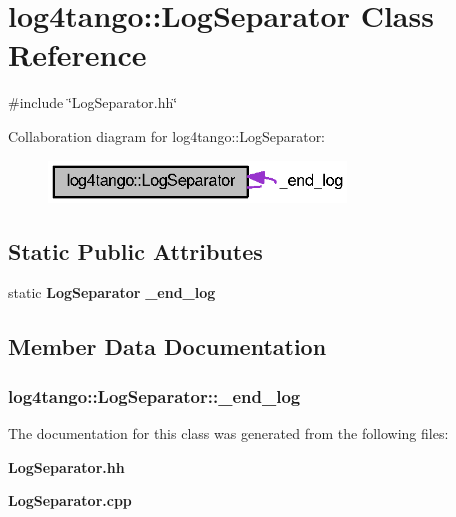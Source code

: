 \section{log4tango\-:\-:Log\-Separator Class Reference}
\label{classlog4tango_1_1LogSeparator}


{\ttfamily \#include \char`\"{}Log\-Separator.\-hh\char`\"{}}



Collaboration diagram for log4tango\-:\-:Log\-Separator\-:
\nopagebreak
\begin{figure}[H]
\begin{center}
\leavevmode
\includegraphics[width=224pt]{d0/d95/classlog4tango_1_1LogSeparator__coll__graph}
\end{center}
\end{figure}
\subsection*{Static Public Attributes}
\begin{DoxyCompactItemize}
\item 
static {\bf Log\-Separator} {\bf \-\_\-end\-\_\-log}
\end{DoxyCompactItemize}


\subsection{Member Data Documentation}
\subsubsection[{\-\_\-end\-\_\-log}]{ log4tango\-::\-Log\-Separator\-::\-\_\-end\-\_\-log\hspace{0.3cm}{\ttfamily [static]}}\label{classlog4tango_1_1LogSeparator_aa953a8c528fc5518c27d69ddb6860311}


The documentation for this class was generated from the following files\-:\begin{DoxyCompactItemize}
\item 
{\bf Log\-Separator.\-hh}\item 
{\bf Log\-Separator.\-cpp}\end{DoxyCompactItemize}
